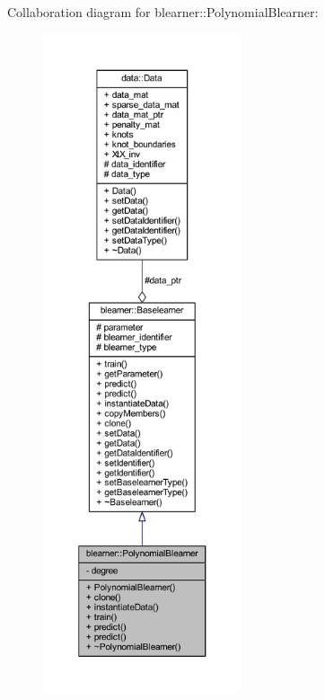 Collaboration diagram for blearner\+:\+:Polynomial\+Blearner\+:
\nopagebreak
\begin{figure}[H]
\begin{center}
\leavevmode
\includegraphics[height=550pt]{classblearner_1_1_polynomial_blearner__coll__graph}
\end{center}
\end{figure}
